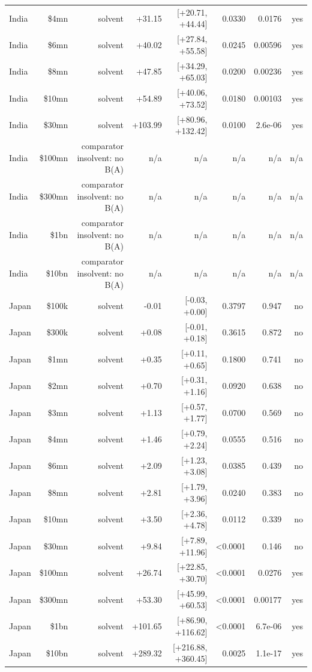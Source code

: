 \begin{table}[t]
\begin{tabular}{lrrrrrrr}
India & \$4mn & solvent & +31.15 & [+20.71, +44.44] & 0.0330 & 0.0176 & yes \\
India & \$6mn & solvent & +40.02 & [+27.84, +55.58] & 0.0245 & 0.00596 & yes \\
India & \$8mn & solvent & +47.85 & [+34.29, +65.03] & 0.0200 & 0.00236 & yes \\
India & \$10mn & solvent & +54.89 & [+40.06, +73.52] & 0.0180 & 0.00103 & yes \\
India & \$30mn & solvent & +103.99 & [+80.96, +132.42] & 0.0100 & 2.6e-06 & yes \\
India & \$100mn & comparator insolvent: no B(A) & n/a & n/a & n/a & n/a & n/a \\
India & \$300mn & comparator insolvent: no B(A) & n/a & n/a & n/a & n/a & n/a \\
India & \$1bn & comparator insolvent: no B(A) & n/a & n/a & n/a & n/a & n/a \\
India & \$10bn & comparator insolvent: no B(A) & n/a & n/a & n/a & n/a & n/a \\
Japan & \$100k & solvent & -0.01 & [-0.03, +0.00] & 0.3797 & 0.947 & no \\
Japan & \$300k & solvent & +0.08 & [-0.01, +0.18] & 0.3615 & 0.872 & no \\
Japan & \$1mn & solvent & +0.35 & [+0.11, +0.65] & 0.1800 & 0.741 & no \\
Japan & \$2mn & solvent & +0.70 & [+0.31, +1.16] & 0.0920 & 0.638 & no \\
Japan & \$3mn & solvent & +1.13 & [+0.57, +1.77] & 0.0700 & 0.569 & no \\
Japan & \$4mn & solvent & +1.46 & [+0.79, +2.24] & 0.0555 & 0.516 & no \\
Japan & \$6mn & solvent & +2.09 & [+1.23, +3.08] & 0.0385 & 0.439 & no \\
Japan & \$8mn & solvent & +2.81 & [+1.79, +3.96] & 0.0240 & 0.383 & no \\
Japan & \$10mn & solvent & +3.50 & [+2.36, +4.78] & 0.0112 & 0.339 & no \\
Japan & \$30mn & solvent & +9.84 & [+7.89, +11.96] & <0.0001 & 0.146 & no \\
Japan & \$100mn & solvent & +26.74 & [+22.85, +30.70] & <0.0001 & 0.0276 & yes \\
Japan & \$300mn & solvent & +53.30 & [+45.99, +60.53] & <0.0001 & 0.00177 & yes \\
Japan & \$1bn & solvent & +101.65 & [+86.90, +116.62] & <0.0001 & 6.7e-06 & yes \\
Japan & \$10bn & solvent & +289.32 & [+216.88, +360.45] & 0.0025 & 1.1e-17 & yes \\

\end{tabular}
\end{table}
